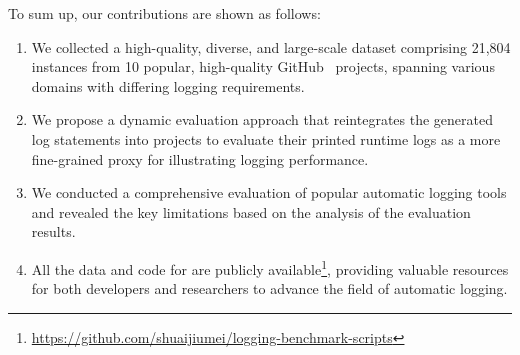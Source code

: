 To sum up, our contributions are shown as follows:
\begin{enumerate}
    \item We collected a high-quality, diverse, and large-scale dataset comprising 21,804 instances from 10 popular, high-quality GitHub~\cite{GitHub} projects, spanning various domains with differing logging requirements.
    \item We propose a dynamic evaluation approach that reintegrates the generated log statements into projects to evaluate their printed runtime logs as a more fine-grained proxy for illustrating logging performance.
    \item We conducted a comprehensive evaluation of popular automatic logging tools and revealed the key limitations based on the analysis of the evaluation results. 
    \item All the data and code for \methodname are publicly available\footnote{\url{https://github.com/shuaijiumei/logging-benchmark-scripts}}, providing valuable resources for both developers and researchers to advance the field of automatic logging.
\end{enumerate}

  